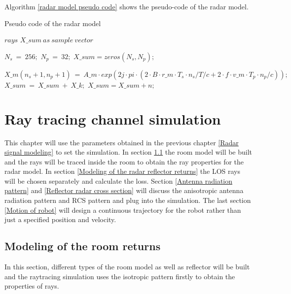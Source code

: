 \documentclass[12pt,DIV14,BCOR12mm,a4paper,footinclude=false,headinclude,parskip=half-,twoside,openright,cleardoublepage=empty,toc=index,bibliography=totoc,listof=totoc]{scrreprt}
\numberwithin{equation}{chapter}
\begin{document}
Algorithm \ref{radar model pseudo code} shows the pseudo-code of the radar model.

\begin{algorithm}
    \caption{Pseudo code of the radar model}
    \label{radar model pseudo code}
    \renewcommand{\algorithmicrequire}{\textbf{Input:}}
    \renewcommand{\algorithmicensure}{\textbf{Output:}}
    
    \begin{algorithmic}[1]
        \REQUIRE $rays$
        \ENSURE $X\_sum\ as\ sample\ vector$
        
        \STATE $N_s\ =\ 256;$
        \STATE $N_p\ =\ 32;$
        \STATE $X\_sum = zeros(N_s,N_p);$
            

                    \STATE $X\_m(n_s+1,n_p+1)\ =\ A\_m \cdot exp(2j\cdot pi \cdot (2\cdot B \cdot r\_m \cdot T_s\cdot n_s/T/c + 2\cdot f\cdot v\_m \cdot T_p\cdot n_p/c));$
                \ENDFOR
            \ENDFOR
            \STATE $X\_sum\ =\ X\_sum\ +\ X\_k;$
        \ENDFOR 
        \STATE $X\_sum = X\_sum + n;$
    \end{algorithmic}
\end{algorithm}

\chapter{Ray tracing channel simulation} \label{Ray tracing channel simulation}
This chapter will use the parameters obtained in the previous chapter \ref{Radar signal modeling} to set the simulation. In section \ref{Modeling of the room returns} the room model will be built and the rays will be traced inside the room to obtain the ray properties for the radar model. In section \ref{Modeling of the radar reflector returns} the LOS rays will be chosen separately and calculate the loss.
Section \ref{Antenna radiation pattern} and \ref{Reflector radar cross section} will discuss the anisotropic antenna radiation pattern and RCS pattern and plug into the simulation. The last section \ref{Motion of robot} will design a continuous trajectory for the robot rather than just a specified position and velocity.

\section{Modeling of the room returns} \label{Modeling of the room returns}
In this section, different types of the room model as well as reflector will be built and the raytracing simulation uses the isotropic pattern firstly to obtain the properties of rays.
\end{document}
